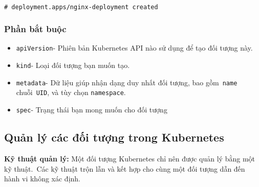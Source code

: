 \documentclass[12pt,a4paper]{report}
\newcommand{\shellcmd}[1]{\\\indent\indent\texttt{\footnotesize\# #1}\\}
\newcommand{\shellcmd}[1]{\\\indent\indent\texttt{\footnotesize\# #1}\\}
\begin{document}
	\hspace{0.3cm}{Đầu ra tương tự như thế này:\\}
	\shellcmd{deployment.apps/nginx-deployment created}
	
	\subsubsection{Phần bắt buộc}
	\hspace{1cm}{Trong tệp .yaml dành cho đối tượng Kubernetes muốn tạo, sẽ cần đặt giá trị cho các trường sau:}
	\begin{itemize}
		\item \texttt{apiVersion}- Phiên bản Kubernetes API nào sử dụng để tạo đối tượng này.
		\item \texttt{kind}- Loại đối tượng bạn muốn tạo.
		\item \texttt{metadata}- Dữ liệu giúp nhận dạng duy nhất đối tượng, bao gồm \texttt{name} chuỗi \texttt{UID}, và tùy chọn \texttt{namespace}.
		\item \texttt{spec}- Trạng thái bạn mong muốn cho đối tượng
	\end{itemize}

	
	\subsection{Quản lý các đối tượng trong Kubernetes}
	
	
	\textbf{Kỹ thuật quản lý:} 
	Một đối tượng Kubernetes chỉ nên được quản lý bằng một kỹ thuật. Các kỹ thuật trộn lẫn và kết hợp cho cùng một đối tượng dẫn đến hành vi không xác định.
	
\end{document}
